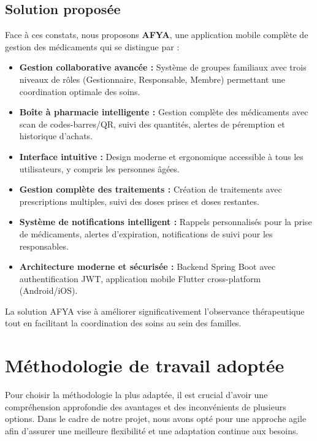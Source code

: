 \subsection{Solution proposée}
Face à ces constats, nous proposons \textbf{AFYA}, une application mobile complète de gestion des médicaments qui se distingue par :

\begin{itemize}
    \item \textbf{Gestion collaborative avancée :} Système de groupes familiaux avec trois niveaux de rôles (Gestionnaire, Responsable, Membre) permettant une coordination optimale des soins.

    \item \textbf{Boîte à pharmacie intelligente :} Gestion complète des médicaments avec scan de codes-barres/QR, suivi des quantités, alertes de péremption et historique d'achats.

    \item \textbf{Interface intuitive :} Design moderne et ergonomique accessible à tous les utilisateurs, y compris les personnes âgées.

    \item \textbf{Gestion complète des traitements :} Création de traitements avec prescriptions multiples, suivi des doses prises et doses restantes.

    \item \textbf{Système de notifications intelligent :} Rappels personnalisés pour la prise de médicaments, alertes d'expiration, notifications de suivi pour les responsables.

    \item \textbf{Architecture moderne et sécurisée :} Backend Spring Boot avec authentification JWT, application mobile Flutter cross-platform (Android/iOS).
\end{itemize}

La solution AFYA vise à améliorer significativement l'observance thérapeutique tout en facilitant la coordination des soins au sein des familles.

\section{Méthodologie de travail adoptée}
Pour choisir la méthodologie la plus adaptée, il est crucial d'avoir une compréhension approfondie des avantages et des inconvénients de plusieurs options. Dans le cadre de notre projet, nous avons opté pour une approche agile afin d'assurer une meilleure flexibilité et une adaptation continue aux besoins.

